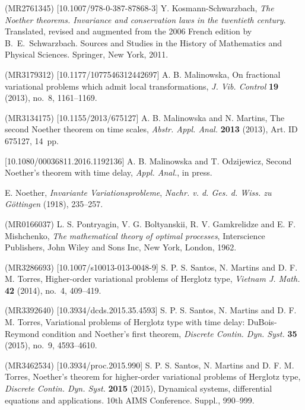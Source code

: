 \documentclass{my-aims}
\theoremstyle{definition}
\begin{document}
\begin{thebibliography}{99}
 (MR2761345) [10.1007/978-0-387-87868-3]  
\newblock Y. Kosmann-Schwarzbach,  
\newblock \emph{The Noether theorems. Invariance and conservation laws in the twentieth century}. 
\newblock Translated, revised and augmented from the 2006 French edition by B.~E.~Schwarzbach. 
\newblock Sources and Studies in the History of Mathematics and Physical Sciences. 
\newblock Springer, New York, 2011. 

 (MR3179312) [10.1177/1077546312442697]
\newblock A. B. Malinowska, 
\newblock On fractional variational problems which admit local transformations, 
\newblock \emph{J. Vib. Control} {\bf 19} (2013), no.~8, 1161--1169. 

 (MR3134175) [10.1155/2013/675127]
\newblock A. B. Malinowska and N. Martins, 
\newblock The second Noether theorem on time scales, 
\newblock \emph{Abstr. Appl. Anal.} {\bf 2013} (2013), Art. ID 675127, 14~pp. 

 [10.1080/00036811.2016.1192136] 
\newblock A. B. Malinowska and T. Odzijewicz,
\newblock Second Noether's theorem with time delay,
\newblock \emph{Appl. Anal.}, in press.

\newblock E. Noether,
\newblock \emph{Invariante Variationsprobleme},
\newblock \emph{Nachr. v. d. Ges. d. Wiss. zu Göttingen} (1918), 235--257.

 (MR0166037)
\newblock L. S. Pontryagin, V. G. Boltyanskii, R. V. Gamkrelidze and E. F. Mishchenko,
\newblock \emph{The mathematical theory of optimal processes},
\newblock Interscience Publishers, John Wiley and Sons Inc, New York, London, 1962.

 (MR3286693) [10.1007/s10013-013-0048-9]
\newblock S. P. S. Santos, N. Martins and D. F. M. Torres,
\newblock Higher-order variational problems of Herglotz type,
\newblock \emph{Vietnam J. Math.} {\bf 42} (2014), no.~4, 409--419.
\newblock {}

 (MR3392640) [10.3934/dcds.2015.35.4593]
\newblock S. P. S. Santos, N. Martins and D. F. M. Torres,
\newblock Variational problems of Herglotz type with time delay:
DuBois-Reymond condition and Noether's first theorem,
\newblock \emph{Discrete Contin. Dyn. Syst.} {\bf 35} (2015), no.~9, 4593--4610.
\newblock {}

 (MR3462534) [10.3934/proc.2015.990]
\newblock S. P. S. Santos, N. Martins and D. F. M. Torres, 
\newblock Noether's theorem for higher-order variational problems of Herglotz type, 
\newblock \emph{Discrete Contin. Dyn. Syst.} {\bf 2015} (2015), 
Dynamical systems, differential equations and applications. 
10th AIMS Conference. Suppl., 990--999. 
\newblock {}


\end{thebibliography}
\end{document}
